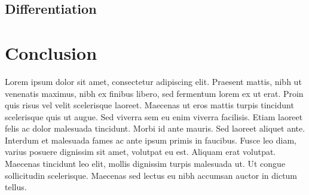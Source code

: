 \documentclass{article}
\begin{document}
\subsection{Differentiation}\label{ssec:differentiation}

\section{Conclusion}\label{ssec:conclusion}

Lorem ipsum dolor sit amet, consectetur adipiscing elit. Praesent mattis, nibh ut venenatis maximus, nibh ex finibus libero, sed fermentum lorem ex ut erat. Proin quis risus vel velit scelerisque laoreet. Maecenas ut eros mattis turpis tincidunt scelerisque quis ut augue. Sed viverra sem eu enim viverra facilisis. Etiam laoreet felis ac dolor malesuada tincidunt. Morbi id ante mauris. Sed laoreet aliquet ante. Interdum et malesuada fames ac ante ipsum primis in faucibus. Fusce leo diam, varius posuere dignissim sit amet, volutpat eu est. Aliquam erat volutpat. Maecenas tincidunt leo elit, mollis dignissim turpis malesuada ut. Ut congue sollicitudin scelerisque. Maecenas sed lectus eu nibh accumsan auctor in dictum tellus.

\nocite{*}
\printbibliography
\end{document}
